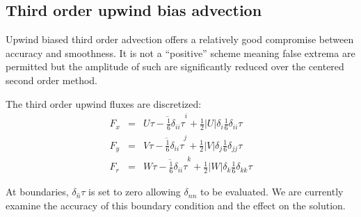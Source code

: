 

\subsection{Third order upwind bias advection}

Upwind biased third order advection offers a relatively good
compromise between accuracy and smoothness. It is not a ``positive''
scheme meaning false extrema are permitted but the amplitude of such
are significantly reduced over the centered second order method.

The third order upwind fluxes are discretized:
\begin{eqnarray}
F_x & = & U \overline{\tau - \frac{1}{6} \delta_{ii} \tau}^i
         + \frac{1}{2} |U| \delta_i \frac{1}{6} \delta_{ii} \tau \\
F_y & = & V \overline{\tau - \frac{1}{6} \delta_{ii} \tau}^j
         + \frac{1}{2} |V| \delta_j \frac{1}{6} \delta_{jj} \tau \\
F_r & = & W \overline{\tau - \frac{1}{6} \delta_{ii} \tau}^k
         + \frac{1}{2} |W| \delta_k \frac{1}{6} \delta_{kk} \tau 
\end{eqnarray}

At boundaries, $\delta_{\hat{n}} \tau$ is set to zero allowing
$\delta_{nn}$ to be evaluated. We are currently examine the accuracy
of this boundary condition and the effect on the solution.


